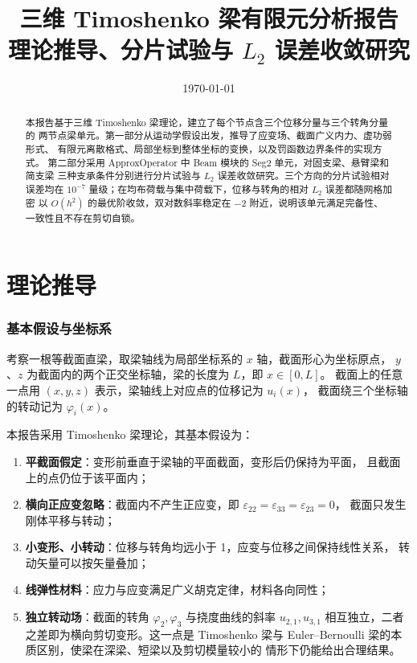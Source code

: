 \documentclass[UTF8,a4paper,11pt]{ctexart}
\title{\bfseries 三维 Timoshenko 梁有限元分析报告\\[4pt]
\large 理论推导、分片试验与 $L_2$ 误差收敛研究}
\author{}
\date{\today}
\begin{document}
\maketitle

\begin{abstract}
本报告基于三维 Timoshenko 梁理论，建立了每个节点含三个位移分量与三个转角分量的
两节点梁单元。第一部分从运动学假设出发，推导了应变场、截面广义内力、虚功弱形式、
有限元离散格式、局部坐标到整体坐标的变换，以及罚函数边界条件的实现方式。
第二部分采用 ApproxOperator 中 Beam 模块的 Seg2 单元，对固支梁、悬臂梁和简支梁
三种支承条件分别进行分片试验与 $L_2$ 误差收敛研究。三个方向的分片试验相对误差均在
$10^{-7}$ 量级；在均布荷载与集中荷载下，位移与转角的相对 $L_2$ 误差都随网格加密
以 $O(h^2)$ 的最优阶收敛，双对数斜率稳定在 $-2$ 附近，说明该单元满足完备性、
一致性且不存在剪切自锁。
\end{abstract}

\newpage
\pagestyle{plain}
\tableofcontents
\newpage
\pagestyle{headings}

\part{理论推导}

\section{基本假设与坐标系}

考察一根等截面直梁，取梁轴线为局部坐标系的 $x$ 轴，截面形心为坐标原点，
$y$、$z$ 为截面内的两个正交坐标轴，梁的长度为 $L$，即 $x\in[0,L]$。
截面上的任意一点用 $(x,y,z)$ 表示，梁轴线上对应点的位移记为 $u_i(x)$，
截面绕三个坐标轴的转动记为 $\varphi_i(x)$。

本报告采用 Timoshenko 梁理论，其基本假设为：
\begin{enumerate}[leftmargin=2em,itemsep=2pt]
  \item \textbf{平截面假定}：变形前垂直于梁轴的平面截面，变形后仍保持为平面，
        且截面上的点仍位于该平面内；
  \item \textbf{横向正应变忽略}：截面内不产生正应变，即
        $\varepsilon_{22}=\varepsilon_{33}=\varepsilon_{23}=0$，
        截面只发生刚体平移与转动；
  \item \textbf{小变形、小转动}：位移与转角均远小于 1，应变与位移之间保持线性关系，
        转动矢量可以按矢量叠加；
  \item \textbf{线弹性材料}：应力与应变满足广义胡克定律，材料各向同性；
  \item \textbf{独立转动场}：截面的转角 $\varphi_2,\varphi_3$ 与挠度曲线的斜率
        $u_{2,1},u_{3,1}$ 相互独立，二者之差即为横向剪切变形。这一点是 Timoshenko
        梁与 Euler--Bernoulli 梁的本质区别，使梁在深梁、短梁以及剪切模量较小的
        情形下仍能给出合理结果。
\end{enumerate}
\end{document}
